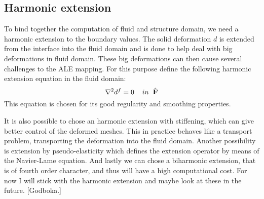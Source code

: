\subsection*{Harmonic extension}
To bind together the computation of fluid and structure domain, we need a harmonic extension to the boundary values. The solid deformation $d$ is extended from the interface into the fluid domain and is done to help deal with big deformations in fluid domain. These big deformations can then cause several challenges to the ALE mapping. 
For this purpose define the following harmonic extension equation in the fluid domain:
$$ \nabla^2 d^f = 0\hspace{4mm}in \hspace{2mm} \mathcal{\hat{F}}$$ 
This equation is chosen for its good regularity and smoothing properties.

It is also possible to chose an harmonic extension with stiffening, which can give better control of the deformed meshes. This in practice behaves like a transport problem, transporting the deformation into the fluid domain. Another possibility is extension by pseudo-elasticity which defines the extension operator by means of the Navier-Lame equation. And lastly we can chose a biharmonic extension, that is of fourth order character, and thus will have a high computational cost. For now I will stick with the harmonic extension and maybe look at these in the future. [Godboka.]

